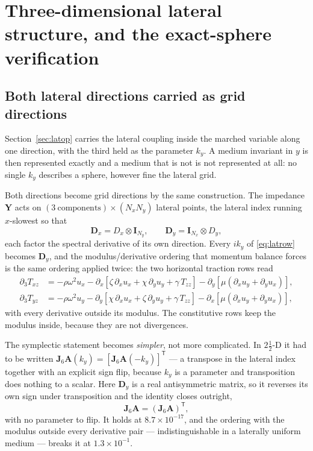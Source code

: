 \documentclass[11pt,a4paper]{article}
\newcommand{\bI}{\mathbf{I}}
\newcommand{\bJ}{\mathbf{J}}
\newcommand{\bA}{\mathbf{A}}
\newcommand{\bY}{\mathbf{Y}}
\begin{document}
\section{Three-dimensional lateral structure, and the exact-sphere
verification}\label{sec:threed}

\subsection{Both lateral directions carried as grid directions}

Section~\ref{sec:latop} carries the lateral coupling inside the marched
variable along one direction, with the third held as the parameter $k_y$.  A
medium invariant in $y$ is then represented exactly and a medium that is not is
not represented at all: no single $k_y$ describes a sphere, however fine the
lateral grid.

Both directions become grid directions by the same construction.  The impedance
$\bY$ acts on $(3\ \text{components})\times(N_xN_y)$ lateral points, the lateral
index running $x$-slowest so that
\begin{equation}
  \mathbf{D}_x = D_x\otimes\bI_{N_y},\qquad
  \mathbf{D}_y = \bI_{N_x}\otimes D_y ,
\end{equation}
each factor the spectral derivative of its own direction.  Every $i k_y$ of
\eqref{eq:latrow} becomes $\mathbf{D}_y$, and the modulus/derivative ordering that
momentum balance forces is the same ordering applied twice: the two horizontal
traction rows read
\begin{align}
  \partial_3 T_{xz} &= -\rho\omega^2 u_x
    - \partial_x\!\left[\zeta\,\partial_x u_x + \chi\,\partial_y u_y
      + \gamma\,T_{zz}\right]
    - \partial_y\!\left[\mu(\partial_x u_y + \partial_y u_x)\right], \\
  \partial_3 T_{yz} &= -\rho\omega^2 u_y
    - \partial_y\!\left[\chi\,\partial_x u_x + \zeta\,\partial_y u_y
      + \gamma\,T_{zz}\right]
    - \partial_x\!\left[\mu(\partial_x u_y + \partial_y u_x)\right],
\end{align}
with every derivative outside its modulus.  The constitutive rows keep the
modulus inside, because they are not divergences.

The symplectic statement becomes \emph{simpler}, not more complicated.  In
$2\tfrac12$-D it had to be written $\bJ_6\bA(k_y) = [\bJ_6\bA(-k_y)]^{\mathsf T}$
--- a transpose in the lateral index together with an explicit sign flip,
because $k_y$ is a parameter and transposition does nothing to a scalar.  Here
$\mathbf{D}_y$ is a real antisymmetric matrix, so it reverses its own sign under
transposition and the identity closes outright,
\begin{equation}
  \bJ_6\bA = (\bJ_6\bA)^{\mathsf T},
  \label{eq:symp3d}
\end{equation}
with no parameter to flip.  It holds at $8.7\times10^{-17}$, and the ordering
with the modulus outside every derivative pair --- indistinguishable in a
laterally uniform medium --- breaks it at $1.3\times10^{-1}$.
\end{document}
